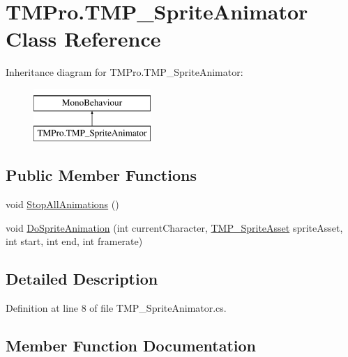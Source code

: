 \hypertarget{class_t_m_pro_1_1_t_m_p___sprite_animator}{}\section{T\+M\+Pro.\+T\+M\+P\+\_\+\+Sprite\+Animator Class Reference}
\label{class_t_m_pro_1_1_t_m_p___sprite_animator}
Inheritance diagram for T\+M\+Pro.\+T\+M\+P\+\_\+\+Sprite\+Animator\+:\begin{figure}[H]
\begin{center}
\leavevmode
\includegraphics[height=2.000000cm]{class_t_m_pro_1_1_t_m_p___sprite_animator}
\end{center}
\end{figure}
\subsection*{Public Member Functions}
\begin{DoxyCompactItemize}
\item 
void \mbox{\hyperlink{class_t_m_pro_1_1_t_m_p___sprite_animator_ade0c942998e861854cd24c280c679320}{Stop\+All\+Animations}} ()
\item 
void \mbox{\hyperlink{class_t_m_pro_1_1_t_m_p___sprite_animator_aaea8d585b20ea1d6f9d96c60033dc1a6}{Do\+Sprite\+Animation}} (int current\+Character, \mbox{\hyperlink{class_t_m_pro_1_1_t_m_p___sprite_asset}{T\+M\+P\+\_\+\+Sprite\+Asset}} sprite\+Asset, int start, int end, int framerate)
\end{DoxyCompactItemize}


\subsection{Detailed Description}


Definition at line 8 of file T\+M\+P\+\_\+\+Sprite\+Animator.\+cs.



\subsection{Member Function Documentation}
\mbox{\label{class_t_m_pro_1_1_t_m_p___sprite_animator_aaea8d585b20ea1d6f9d96c60033dc1a6}} 
